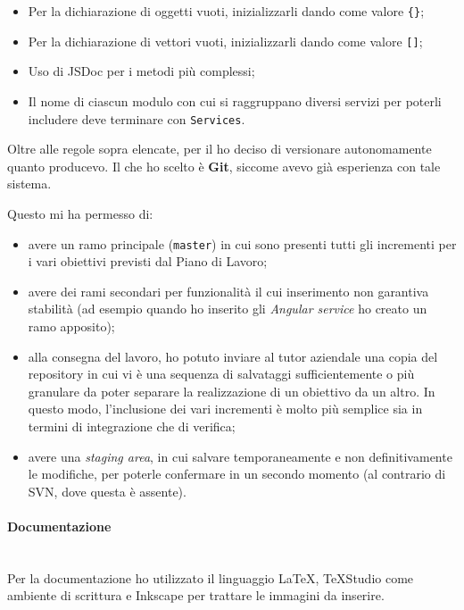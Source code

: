 \begin{itemize}
\item Per la dichiarazione di oggetti vuoti, inizializzarli dando come valore
  \texttt{\{\}};
\item Per la dichiarazione di vettori vuoti, inizializzarli dando come valore
  \texttt{[]};
\item Uso di JSDoc per i metodi più complessi;
\item Il nome di ciascun modulo con cui si raggruppano diversi servizi per
  poterli includere deve terminare con \texttt{Services}.
\end{itemize}

Oltre alle regole sopra elencate, per il \FREND{} ho deciso di versionare
autonomamente quanto producevo. Il  che ho scelto è \textbf{Git},
siccome avevo già esperienza con tale sistema.

Questo mi ha permesso di:

\begin{itemize}
\item avere un ramo principale (\texttt{master}) in cui sono presenti tutti
  gli incrementi per i vari obiettivi previsti dal Piano di Lavoro;
\item avere dei rami secondari per funzionalità il cui inserimento non
  garantiva stabilità (ad esempio quando ho inserito gli
  \emph{Angular service} ho creato un ramo apposito);
\item alla consegna del lavoro, ho potuto inviare al tutor aziendale una copia
  del \gls{repository} in cui vi è una sequenza di salvataggi
  sufficientemente o più granulare da poter separare la realizzazione di un
  obiettivo da un altro. In questo modo, l'inclusione dei vari
  incrementi è molto più semplice sia in termini di integrazione che di
  verifica;
\item avere una \emph{staging area}, in cui salvare temporaneamente e non
  definitivamente le modifiche, per poterle confermare in un secondo momento
  (al contrario di SVN, dove questa è assente).
\end{itemize}

\paragraph{Documentazione} \mbox{} \\

Per la documentazione ho utilizzato il linguaggio \LaTeX{}, \TeX{}Studio come
ambiente di scrittura e Inkscape per trattare le immagini da inserire.

